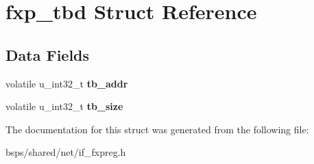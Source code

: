 \hypertarget{structfxp__tbd}{}\section{fxp\+\_\+tbd Struct Reference}
\label{structfxp__tbd}
\subsection*{Data Fields}
\begin{DoxyCompactItemize}
\item 
\mbox{\label{structfxp__tbd_ae9a30c1ffe9045d59825f90977ab35a1}} 
volatile u\+\_\+int32\+\_\+t {\bfseries tb\+\_\+addr}
\item 
\mbox{\label{structfxp__tbd_a19e8da618f6a1ebcf90a5ccb5b252b95}} 
volatile u\+\_\+int32\+\_\+t {\bfseries tb\+\_\+size}
\end{DoxyCompactItemize}


The documentation for this struct was generated from the following file\+:\begin{DoxyCompactItemize}
\item 
bsps/shared/net/if\+\_\+fxpreg.\+h\end{DoxyCompactItemize}
